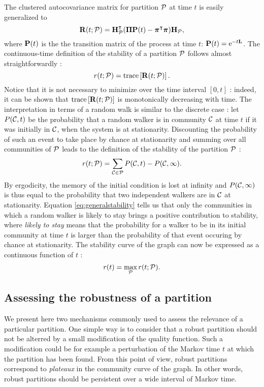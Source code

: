 The clustered autocovariance matrix for partition $\P$ at time $t$ is easily generalized to 
\begin{equation}
	\b R(t;\P) = \b H_{\P}^{\t}(\b \Pi\b P(t) - \bs \pi^{\t}\bs \pi)\b H_{\P},
\end{equation}
where $\b P(t)$ is the the transition matrix of the process at time $t$: $\b P(t) = \Exp^{-t\b L}$. The continuous-time definition of the stability of a partition $\P$ follows almost straightforwardly :
\begin{equation}
	r(t;\P) = \trace \left[ \b R(t; \P) \right].
\end{equation}
Notice that it is not necessary to minimize over the time interval $[0,t]$ : indeed, it can be shown that $\trace \left[ \b R(t;\P) \right]$ is monotonically decreasing with time. The interpretation in terms of a random walk is similar to the discrete case : let $P(\C,t)$ be the probability that a random walker is in community $\C$ at time $t$ if it was initially in $\C$, when the system is at stationarity. Discounting the probability of such an event to take place by chance at stationarity and summing over all communities of $\P$ leads to the definition of the stability of the partition $\P$ :
\begin{equation} \label{eq:generalstability}
	r(t;\P) = \sum_{\C \in \P} P(\C,t) - P(\C,\infty).
\end{equation}
By ergodicity, the memory of the initial condition is lost at infinity and $P(\C,\infty)$ is thus equal to the probability that two independent walkers are in $\C$ at stationarity. Equation \eqref{eq:generalstability} tells us that only the communities in which a random walker is likely to stay brings a positive contribution to stability, where \textit{likely to stay} means that the probability for a walker to be in its initial community at time $t$ is larger than the probability of that event occuring by chance at stationarity. The stability curve of the graph can now be expressed as a continuous function of $t$ :
\begin{equation}
	r(t) = \max_{\P} r(t;\P).
\end{equation}

\subsection{Assessing the robustness of a partition} \label{subsec:robustness}
We present here two mechanisms commonly used to assess the relevance of a particular partition. One simple way is to consider that a robust partition should not be alterred by a small modification of the quality function. Such a modification could be for example a perturbation of the Markov time $t$ at which the partition has been found. From this point of view, robust partitions correspond to \textit{plateaux} in the community curve of the graph. In other words, robust partitions should be persistent over a wide interval of Markov time.

